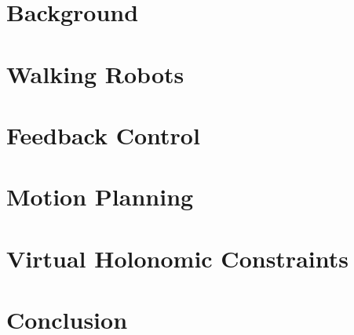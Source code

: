 \section{Background}


\section{Walking Robots}


\section{Feedback Control} \label{sec:feedback}
 

\section{Motion Planning}


\section{Virtual Holonomic Constraints}\label{sec:virtconstraint}


\section{Conclusion}
